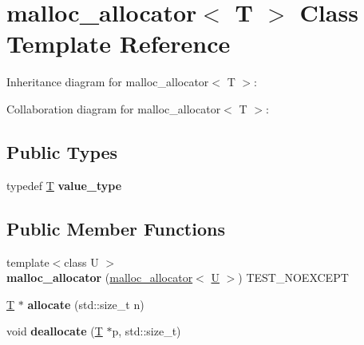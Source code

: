 \hypertarget{classmalloc__allocator}{}\section{malloc\+\_\+allocator$<$ T $>$ Class Template Reference}
\label{classmalloc__allocator}


Inheritance diagram for malloc\+\_\+allocator$<$ T $>$\+:


Collaboration diagram for malloc\+\_\+allocator$<$ T $>$\+:
\subsection*{Public Types}
\begin{DoxyCompactItemize}
\item 
\mbox{\label{classmalloc__allocator_aa60947b824a9737ee4a0a62230b05f3b}} 
typedef \mbox{\hyperlink{struct_t}{T}} {\bfseries value\+\_\+type}
\end{DoxyCompactItemize}
\subsection*{Public Member Functions}
\begin{DoxyCompactItemize}
\item 
\mbox{\label{classmalloc__allocator_a231ac4c025f4e92f2494d10c17a22f64}} 
{\footnotesize template$<$class U $>$ }\\{\bfseries malloc\+\_\+allocator} (\mbox{\hyperlink{classmalloc__allocator}{malloc\+\_\+allocator}}$<$ \mbox{\hyperlink{union_u}{U}} $>$) T\+E\+S\+T\+\_\+\+N\+O\+E\+X\+C\+E\+PT
\item 
\mbox{\label{classmalloc__allocator_a38df8f4a1bcb2adfa67f42b5f16f73bf}} 
\mbox{\hyperlink{struct_t}{T}} $\ast$ {\bfseries allocate} (std\+::size\+\_\+t n)
\item 
\mbox{\label{classmalloc__allocator_a686c669ab31dc8d560f388177fa1ff8c}} 
void {\bfseries deallocate} (\mbox{\hyperlink{struct_t}{T}} $\ast$p, std\+::size\+\_\+t)
\end{DoxyCompactItemize}
